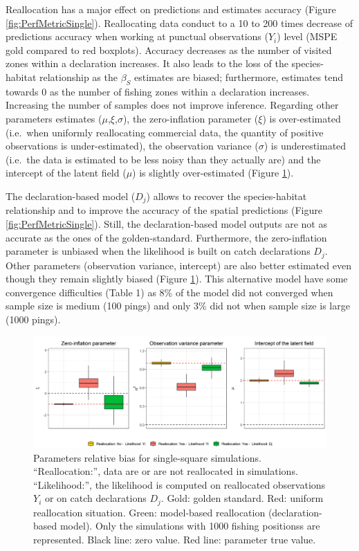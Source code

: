 \documentclass[
  english,
  man]{apa6}
\begin{document}
Reallocation has a major effect on predictions and estimates accuracy (Figure \ref{fig:PerfMetricSingle}). Reallocating data conduct to a 10 to 200 times decrease of predictions accuracy when working at punctual observations (\(Y_i\)) level (MSPE gold compared to red boxplots). Accuracy decreases as the number of visited zones within a declaration increases. It also leads to the loss of the species-habitat relationship as the \(\beta_S\) estimates are biased; furthermore, estimates tend towards 0 as the number of fishing zones within a declaration increases. Increasing the number of samples does not improve inference. Regarding other parameters estimates (\(\mu\),\(\xi\),\(\sigma\)), the zero-inflation parameter (\(\xi\)) is over-estimated (i.e.~when uniformly reallocating commercial data, the quantity of positive observations is under-estimated), the observation variance (\(\sigma\)) is underestimated (i.e.~the data is estimated to be less noisy than they actually are) and the intercept of the latent field (\(\mu\)) is slightly over-estimated (Figure \ref{fig:ParBiasSingle}).

The declaration-based model (\(D_j\)) allows to recover the species-habitat relationship and to improve the accuracy of the spatial predictions (Figure \ref{fig:PerfMetricSingle}). Still, the declaration-based model outputs are not as accurate as the ones of the golden-standard. Furthermore, the zero-inflation parameter is unbiased when the likelihood is built on catch declarations \(D_j\). Other parameters (observation variance, intercept) are also better estimated even though they remain slightly biased (Figure \ref{fig:ParBiasSingle}). This alternative model have some convergence difficulties (Table 1) as 8\% of the model did not converged when sample size is medium (100 pings) and only 3\% did not when sample size is large (1000 pings).

\begin{figure}
\centering
\includegraphics{images/par_plot_single_square.png}
\caption{\label{fig:ParBiasSingle} Parameters relative bias for single-square simulations. \enquote{Reallocation:}, data are or are not reallocated in simulations. \enquote{Likelihood:}, the likelihood is computed on reallocated observations \(Y_i\) or on catch declarations \(D_j\). Gold: golden standard. Red: uniform reallocation situation. Green: model-based reallocation (declaration-based model). Only the simulations with 1000 fishing positionss are represented. Black line: zero value. Red line: parameter true value.}
\end{figure}
\end{document}
